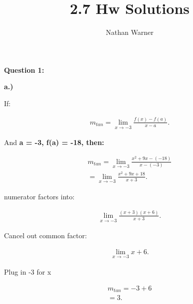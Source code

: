 \documentclass{report}
\title{\Huge{2.7 Hw Solutions}}
\author{\huge{Nathan Warner}}
\date{\huge{}}
\begin{document}
    \maketitle
    \begin{Large}
        \noindent \textbf{Question 1:}
    \end{Large}
    \bigbreak \noindent 
    \bigbreak \noindent 
    \textbf{a.)}
    \begin{center}
        If:
    \end{center}
    \begin{align*}
        m_{tan} = \lim\limits_{x \to -3}{ \frac{f(x) - f(a)}{x - a}}
    .\end{align*}
    \begin{center}
        And \textbf{a = -3, f(a) = -18, then:}
    \end{center}
    \begin{align*}
        m_{tan} = \lim\limits_{x \to -3}{ \frac{x^2+9x- \left(-18\right)}{x - \left(-3\right)}} \\ 
        = \lim\limits_{x \to -3}{ \frac{x^2 +9x+18}{x + 3}}
    .\end{align*}
    \begin{center}
        numerator factors into:
    \end{center}
    \begin{align*}
        \lim\limits_{x \to -3}{ \frac{ \left(x+3\right) \left(x+6\right)}{x+3}}
    .\end{align*}
    \begin{center}
        Cancel out common factor:
    \end{center}
    \begin{align*}
        \lim\limits_{x  \to -3}{x+6} 
    .\end{align*}
    \begin{center}
        Plug in -3 for x
    \end{center}
    \begin{align*}
        m_{tan} = -3 + 6 \\ 
        = 3
    .\end{align*}
\end{document}
